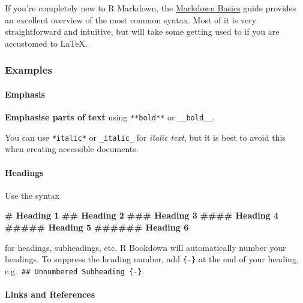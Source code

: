 \documentclass[
]{article}
\newenvironment{Shaded}{\begin{snugshade}}{\end{snugshade}}
\newcommand{\FunctionTok}[1]{\textcolor[rgb]{0.13,0.29,0.53}{\textbf{#1}}}
\numberwithin{equation}{section}
\numberwithin{figure}{section}
\theoremstyle{break}
\theoremstyle{definition}
\theoremstyle{definition}
\theoremstyle{definition}
\theoremstyle{definition}
\theoremstyle{remark}
\begin{document}
If you're completely new to R Markdown, the \href{https://rmarkdown.rstudio.com/authoring_basics.html?target=_blank}{Markdown Basics} guide provides an excellent overview of the most common syntax. Most of it is very straightforward and intuitive, but will take some getting used to if you are accustomed to LaTeX.

\hypertarget{examples}{%
\subsubsection{Examples}\label{examples}}

\hypertarget{emphasis}{%
\paragraph*{Emphasis}\label{emphasis}}

\textbf{Emphasise parts of text} using \texttt{**bold**} or \texttt{\_\_bold\_\_}.

You can use \texttt{*italic*} or \texttt{\_italic\_} for \emph{italic text}, but it is best to avoid this when creating accessible documents.

\hypertarget{headings}{%
\paragraph*{Headings}\label{headings}}

Use the syntax

\begin{Shaded}
\begin{Highlighting}[]
\FunctionTok{\# Heading 1}
\FunctionTok{\#\# Heading 2}
\FunctionTok{\#\#\# Heading 3}
\FunctionTok{\#\#\#\# Heading 4}
\FunctionTok{\#\#\#\#\# Heading 5}
\FunctionTok{\#\#\#\#\#\# Heading 6}
\end{Highlighting}
\end{Shaded}

for headings, subheadings, etc. R Bookdown will automatically number your headings. To suppress the heading number, add \texttt{\{-\}} at the end of your heading, e.g.~\texttt{\#\#\ Unnumbered\ Subheading\ \{-\}}.

\hypertarget{links-and-references}{%
\paragraph*{Links and References}\label{links-and-references}}
\end{document}
